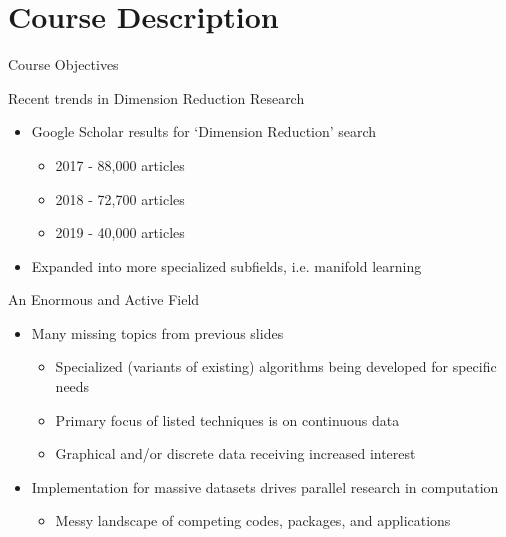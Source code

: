 \documentclass{beamer}
\begin{document}
\section{Course Description}
\begin{frame}{Course Objectives}


\begin{block}{Recent trends in Dimension Reduction Research}
\begin{itemize}
\item Google Scholar results for `Dimension Reduction' search
\begin{itemize}
\item 2017 - 88,000 articles
\item 2018 - 72,700 articles
\item 2019 - 40,000 articles
\end{itemize}
\item Expanded into more specialized subfields, i.e. manifold learning \pause
\end{itemize}
\end{block}
\begin{block}{An Enormous and Active Field}
\begin{itemize}
\item Many missing topics from previous slides
\begin{itemize}
\item Specialized (variants of existing) algorithms being developed for specific needs
\item Primary focus of listed techniques is on continuous data
\item Graphical and/or discrete data receiving increased interest
\end{itemize}

\item Implementation for massive datasets drives parallel research in computation
\begin{itemize}
\item Messy landscape of competing codes, packages, and applications
\end{itemize}
\end{itemize}
\end{block}
\end{frame}
\end{document}
